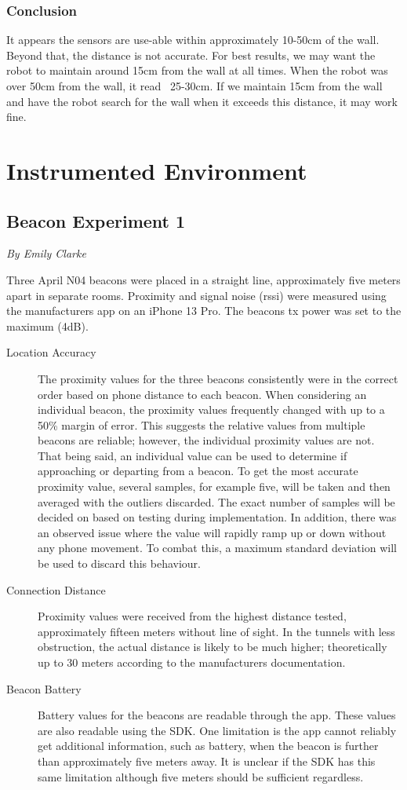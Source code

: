 \documentclass[12pt]{report}
\newcommand{\sectionAuthor}[1]{{\small\vspace{-1em}\textit{#1}}\bigskip\par}
\begin{document}
\subsubsection{Conclusion}
It appears the sensors are use-able within approximately 10-50cm of the wall. Beyond that, the distance is not accurate. For best results, we may want the robot to maintain around 15cm from the wall at all times. When the robot was over 50cm from the wall, it read ~25-30cm. If we maintain 15cm from the wall and have the robot search for the wall when it exceeds this distance, it may work fine.

\section{Instrumented Environment}
\subsection{Beacon Experiment 1}
\sectionAuthor{By Emily Clarke}
Three April N04 beacons were placed in a straight line, approximately five meters apart in separate rooms. Proximity and signal noise (rssi) were measured using the manufacturers app on an iPhone 13 Pro. The beacons tx power was set to the maximum (4dB).
\begin{description}
    \item[Location Accuracy] The proximity values for the three beacons consistently were in the correct order based on phone distance to each beacon. When considering an individual beacon, the proximity values frequently changed with up to a 50\% margin of error. This suggests the relative values from multiple beacons are reliable; however, the individual proximity values are not. That being said, an individual value can be used to determine if approaching or departing from a beacon. To get the most accurate proximity value, several samples, for example five, will be taken and then averaged with the outliers discarded. The exact number of samples will be decided on based on testing during implementation. In addition, there was an observed issue where the value will rapidly ramp up or down without any phone movement. To combat this, a maximum standard deviation will be used to discard this behaviour. 
    \item[Connection Distance] Proximity values were received from the highest distance tested, approximately fifteen meters without line of sight. In the tunnels with less obstruction, the actual distance is likely to be much higher; theoretically up to 30 meters according to the manufacturers documentation.
    \item[Beacon Battery] Battery values for the beacons are readable through the app. These values are also readable using the SDK. One limitation is the app cannot reliably get additional information, such as battery, when the beacon is further than approximately five meters away. It is unclear if the SDK has this same limitation although five meters should be sufficient regardless. 
\end{description}
\end{document}
